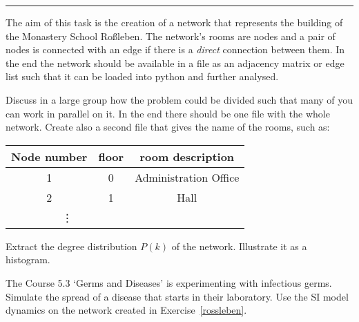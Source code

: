 

\usepackage{pstricks,pst-node,pst-tree}





  \sheet[%
  number=4,
      topic={Contagion Dynamics},
    ]

\vspace{-1cm}
\noindent\rule{12cm}{0.4pt}

  \exercise[%
  topic = A Network of the Monastery School Ro\ss leben 
    ]

\label{rossleben}

The aim of this task is the creation of a network that represents the
building of the Monastery School Ro\ss leben. The network's rooms are
nodes and a pair of nodes is connected with an edge if there is a
\emph{direct} connection between them. In the end the network should be
available in a file as an adjacency matrix or edge list such that it can be loaded into
python and further analysed.

 \subexercise[%
  topic=Dividing the Problem up,
    ]

Discuss in a large group how the problem could be divided such that many
of you can work in parallel on it. In the end there should be one file
with the whole network. Create also a second file that gives the name of
the rooms, such as:


\begin{tabular}[h]{c|c|c}
Node number & floor & room description \\ \hline
1 & 0 & Administration Office\\
2 & 1 & Hall\\
\multicolumn{2}{c}{\vdots}
\end{tabular}



 \subexercise[%
  topic= Degree distribution,
    ]

Extract the degree distribution $P(k)$ of the network. Illustrate it as a histogram.


\exercise[%
  topic =  Pandemic in the Monastery School
    ]

The Course 5.3 `Germs and Diseases' is experimenting with infectious germs. Simulate the spread of a disease that starts in their laboratory. Use the SI model dynamics on the network created in Exercise~\ref{rossleben}.


\subexercise[%
  topic= Complete Infection,
    ]


